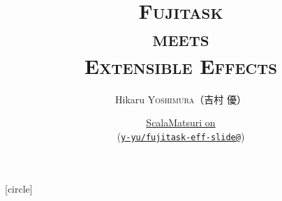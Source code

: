 \setmonofont[Ligatures=TeX]{CMU Typewriter Text}

\newcommand{\xcolon}{：}
\newcommand{\Fujitask}{{\rmfamily\bfseries Fujitask}}

\title[Fujitask meets Extensible Effects]{%
  {\bfseries\rmfamily\mcfamily\huge\scshape
    \Fujitask \\
    meets\\
    Extensible Effects%
  }%
}
\author[Hikaru Yoshimura]{%
  Hikaru \textsc{Yoshimura}（吉村 優）
}
\date[ScalaMatsuri, June 209 2019]{%
  \href{https://www.tryswift.co/events/2019/tokyo/en/}{ScalaMatsuri on } \\
  {\scriptsize (\href{https://github.com/y-yu/fujitask-eff-slide}{\texttt{y-yu/fujitask-eff-slide@\GITAbrHash}})}%
}







[circle]

\newcommand\ballcircle[1]{%
  {%
    \usebeamercolor{enumerate item}%
    \tikzset{beameritem/.style={circle,inner sep=0,minimum size=2ex,text=enumerate item.bg,fill=enumerate item.fg,font=\footnotesize}}%
    \tikz[baseline=(n.base)]\node(n)[beameritem]{#1};%
  }
}
\newcommand\ballref[1]{%
  \ballcircle{\ref{#1}}
}

\newcommand\ce[1]{%
  \coloremoji{#1}
}

\newenvironment{notes}
  {%
    \begin{xlrbox}{NotesBox}
    \begin{minipage}{.95\textwidth}
    \small\rmfamily\mcfamily
    \begin{itemize}
    \setlength{\itemindent}{0em}
  }{%
    \end{itemize}
    \end{minipage}
    \end{xlrbox}
    \note{\theNotesBox}}

\makeatletter
\newsavebox\temp@simple@callout@box
\newcommand{\simplecallout}[3]{%
  \sbox{\temp@simple@callout@box}{\mbox{#3}}%
  \begin{center}%
    \begin{tikzpicture}%
      \calloutquote[width=1.1\wd\temp@simple@callout@box,position={(#1.5,-0.2)},fill=#2,rounded corners]{
        #3%
      }%
    \end{tikzpicture}%
  \end{center}
}
\makeatother



